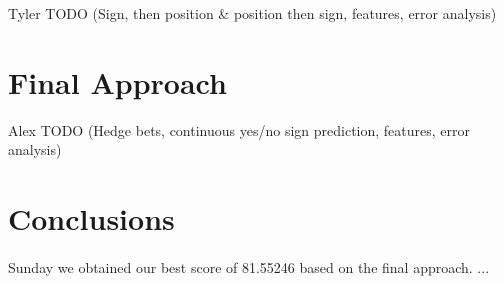\documentclass[letterpaper]{article}
\begin{document}
Tyler TODO (Sign, then position \& position then sign, features, error analysis)

\section*{Final Approach}

Alex TODO (Hedge bets, continuous yes/no sign prediction, features, error analysis)

\section*{Conclusions}

\paragraph{} Sunday we obtained our best score of 81.55246 based on the final approach. ...
\end{document}
